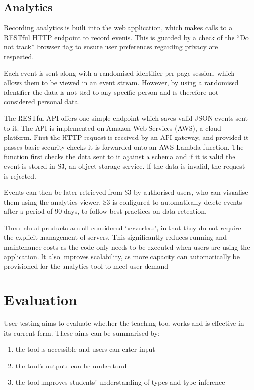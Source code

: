 \documentclass[a4paper,fleqn,twoside,12pt]{report}
\begin{document}
\section{Analytics}\label{id:h.39bhrrv1fi5p}
Recording analytics is built into the web application, which makes calls to a RESTful HTTP endpoint to record events. This is guarded by a check of the “Do not track” browser flag to ensure user preferences regarding privacy are respected.

Each event is sent along with a randomised identifier per page session, which allows them to be viewed in an event stream. However, by using a randomised identifier the data is not tied to any specific person and is therefore not considered personal data.

The RESTful API offers one simple endpoint which saves valid JSON events sent to it. The API is implemented on Amazon Web Services (AWS), a cloud platform. First the HTTP request is received by an API gateway, and provided it passes basic security checks it is forwarded onto an AWS Lambda function. The function first checks the data sent to it against a schema and if it is valid the event is stored in S3, an object storage service. If the data is invalid, the request is rejected.

Events can then be later retrieved from S3 by authorised users, who can visualise them using the analytics viewer. S3 is configured to automatically delete events after a period of 90 days, to follow best practices on data retention.

These cloud products are all considered ‘serverless’, in that they do not require the explicit management of servers. This significantly reduces running and maintenance costs as the code only needs to be executed when users are using the application. It also improves scalability, as more capacity can automatically be provisioned for the analytics tool to meet user demand.
\chapter{Evaluation}\label{id:h.e6letww4nhn0}
User testing aims to evaluate whether the teaching tool works and is effective in its current form. These aims can be summarised by:
\begin{enumerate}
  \item the tool is accessible and users can enter input
  \item the tool’s outputs can be understood
  \item the tool improves students’ understanding of types and type inference
\end{enumerate}
\end{document}
